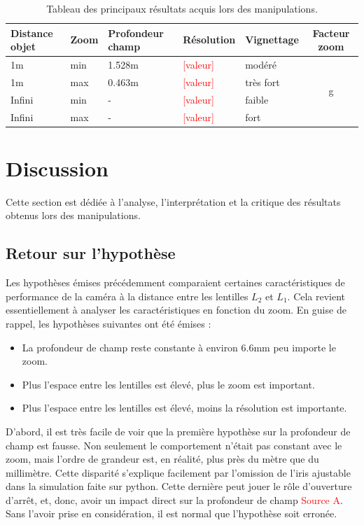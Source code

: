 \documentclass[11pt,letterpaper]{article}
\begin{document}
\begin{table}[h]
\centering
\begin{tabular}{|l|l||l|l|l||c|}
\hline
\textbf{Distance objet} & \textbf{Zoom} & \textbf{Profondeur champ} & \textbf{Résolution} & \textbf{Vignettage} & \textbf{Facteur zoom} \\ \hline
1m & min  & 1.528m & \textcolor{red}{[valeur]} & modéré & \multirow{4}{*}{g} \\ \cline{1-5}
1m & max  & 0.463m & \textcolor{red}{[valeur]} & très fort & \\ \cline{1-5}
Infini & min  & - & \textcolor{red}{[valeur]} & faible & \\ \cline{1-5}
Infini & max  & - & \textcolor{red}{[valeur]} & fort & \\ \hline
\end{tabular}
\caption{Tableau des principaux résultats acquis lors des manipulations.}
\end{table}


\section{Discussion}

Cette section est dédiée à l'analyse, l'interprétation et la critique des résultats
obtenus lors des manipulations.

\subsection{Retour sur l'hypothèse}

Les hypothèses émises précédemment comparaient certaines caractéristiques de performance
de la caméra à la distance entre les lentilles $L_2$ et $L_1$. Cela revient 
essentiellement à analyser les caractéristiques en fonction du zoom. En guise de rappel,
les hypothèses suivantes ont été émises :

\begin{itemize}
\item La profondeur de champ reste constante à environ 6.6mm peu importe le zoom.
\item Plus l'espace entre les lentilles est élevé, plus le zoom est important.
\item Plus l'espace entre les lentilles est élevé, moins la résolution est importante.
\end{itemize}

D'abord, il est très facile de voir que la première hypothèse sur la profondeur
de champ est fausse. Non seulement le comportement n'était pas constant avec le zoom,
mais l'ordre de grandeur est, en réalité, plus près du mètre que du millimètre. Cette
disparité s'explique facilement par l'omission de l'iris ajustable dans la simulation
faite sur python. Cette dernière peut jouer le rôle d'ouverture d'arrêt, et, donc, avoir
un impact direct sur la profondeur de champ \textcolor{red}{Source A}. Sans l'avoir 
prise en considération, il est normal que l'hypothèse soit erronée.
\end{document}
